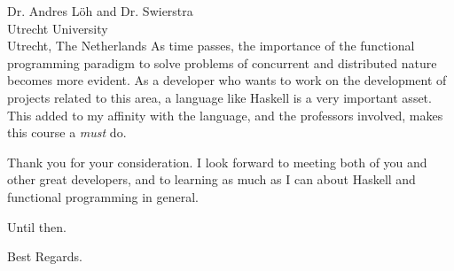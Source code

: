\documentclass{letter} %
\begin{document}
\begin{letter}{Dr. Andres L\"oh and Dr. Swierstra\\
Utrecht University \\
Utrecht, The Netherlands}
\noindent As time passes, the importance of the functional programming paradigm to solve problems of concurrent and distributed nature becomes more evident. As a developer who wants to work on the development of projects related to this area, a language like Haskell is a very important asset. This added to my affinity with the language, and the professors involved, makes this course a \emph{must} do.
 
\noindent Thank you for your consideration. I look forward to meeting both of you and other great developers, and to learning as much as I can about Haskell and functional programming in general.

Until then.

\closing{Best Regards.}

\end{letter}
 
\end{document}
